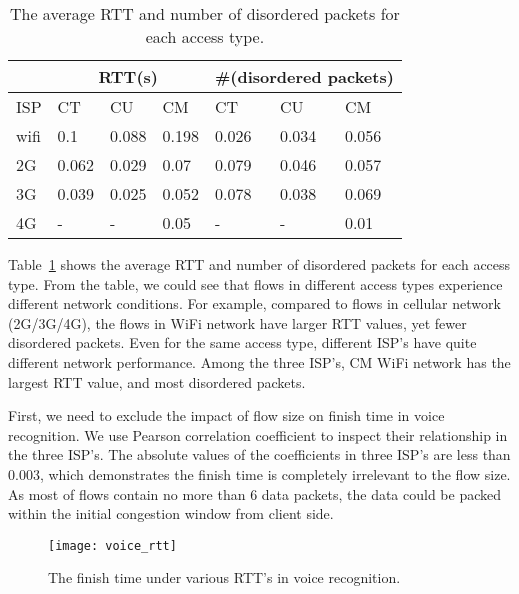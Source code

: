 \begin{table}[th]
\caption{The average RTT and number of disordered packets for each access type.}
\label{tab:voice_access_type_stats}
\centering
\renewcommand{\arraystretch}{1.2}
\begin{tabular}{l|l|l|l|l|l|l}
	\toprule
	& \multicolumn{3}{c|}{ RTT(s) } & \multicolumn{3}{c}{ \#(disordered packets) } \\
	\midrule
	ISP & CT & CU & CM & CT & CU & CM \\
	\midrule
	wifi & 0.1 & 0.088 & 0.198 & 0.026 & 0.034 & 0.056 \\
	\hline
	2G & 0.062 & 0.029 & 0.07 & 0.079 & 0.046 & 0.057 \\
	\hline
	3G & 0.039 & 0.025 & 0.052 & 0.078 & 0.038 & 0.069 \\
	\hline
	4G & - & - & 0.05 & - & - & 0.01 \\
	\bottomrule
\end{tabular}
\end{table}

Table~\ref{tab:voice_access_type_stats} shows the average RTT and number of disordered packets for each access type. From the table, we could see that flows in different access types experience different network conditions. For example, compared to flows in cellular network (2G/3G/4G), the flows in WiFi network have larger RTT values, yet fewer disordered packets. Even for the same access type, different ISP's have quite different network performance. Among the three ISP's, CM WiFi network has the largest RTT value, and most disordered packets. 

First, we need to exclude the impact of flow size on finish time in voice recognition. We use Pearson correlation coefficient to inspect their relationship in the three ISP's. The absolute values of the coefficients in three ISP's are less than 0.003, which demonstrates the finish time is completely irrelevant to the flow size. As most of flows contain no more than 6 data packets, the data could be packed within the initial congestion window from client side.

\begin{figure}[!htbp]
\centering
	\texttt{[image: voice\_rtt]}
\caption{The finish time under various RTT's in voice recognition.}
\label{fig:voice_rtt}
\end{figure}

